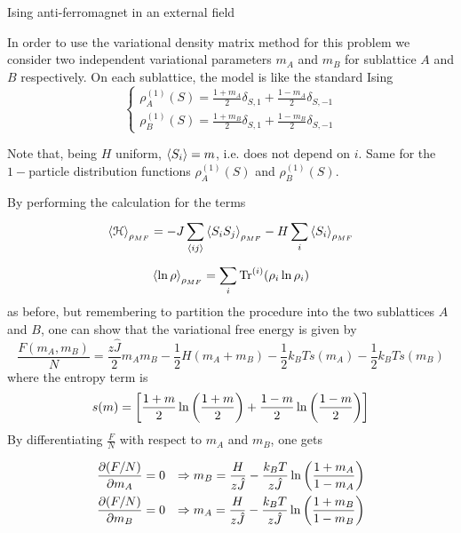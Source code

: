 \documentclass[../main/main.tex]{subfiles}
\begin{document}
\begin{example}{Ising anti-ferromagnet in an external field}{}
\begin{itemize}
In order to use the variational density matrix method for this problem we consider two independent variational parameters \( m_A \) and \( m_B \) for sublattice \( A \) and \( B \) respectively. On each sublattice, the model is like the standard Ising
\begin{equation*}
  \begin{cases}
   \rho _A^{(1)}(S) = \frac{1+m_A}{2} \delta _{S,1}+ \frac{1-m_A}{2}\delta _{S,-1}\\
   \rho _B^{(1)}(S) = \frac{1+m_B}{2} \delta _{S,1}+ \frac{1-m_B}{2}\delta _{S,-1}
  \end{cases}
\end{equation*}
\begin{remark}
Note that, being \( H \) uniform, \( \expval{S_i} = m \), i.e. does not depend on \( i \). Same for the \( 1- \)particle distribution functions \( \rho _A^{(1)}(S) \) and  \( \rho _B^{(1)}(S) \).
\end{remark}
By performing the calculation for the terms
\begin{equation*}
  \expval{\mathcal{H}}_{\rho _{MF}} = - J \sum_{\expval{ij} }^{} \expval{S_i S_j}_{\rho _{MF}} - H \sum_{i}^{} \expval{S_i}_{\rho _{MF}}
\end{equation*}
\begin{equation*}
  \expval{\ln{\rho } }_{\rho _{MF}} = \sum_{i}^{} \Tr^{(i)}(\rho _i \ln{\rho _i} )
\end{equation*}
as before, but remembering to partition the procedure into the two sublattices \( A \) and \( B \), one can show that the variational free energy is given by
\begin{equation}
  \frac{F(m_A,m_B)}{N} = \frac{z \hat{J} }{2}m_A m_B - \frac{1}{2}H (m_A+m_B)
  - \frac{1}{2} k_B T s(m_A) - \frac{1}{2}k_B T s(m_B)
\end{equation}
where the entropy term is 
\begin{equation*}
  s(m) = \qty[\frac{1+m}{2} \ln{\qty(\frac{1+m}{2}) } + \frac{1-m}{2} \ln{\qty(\frac{1-m}{2}) }  ]
\end{equation*}
By differentiating \( \frac{F}{N} \) with respect to \( m_A \) and \( m_B \), one gets
\begin{subequations*}
\begin{align*}
   \pdv{(F/N)}{m_A} &= 0 & \Rightarrow m_B = \frac{H}{z \hat{J} } - \frac{k_B T}{z \hat{J} }\ln{\qty(\frac{1+m_A}{1-m_A}) } \\
   \pdv{(F/N)}{m_B} &= 0 & \Rightarrow m_A = \frac{H}{z \hat{J} } - \frac{k_B T}{z \hat{J} }\ln{\qty(\frac{1+m_B}{1-m_B}) }

\end{align*}
\end{subequations*}
\end{itemize}
\end{example}
\end{document}
